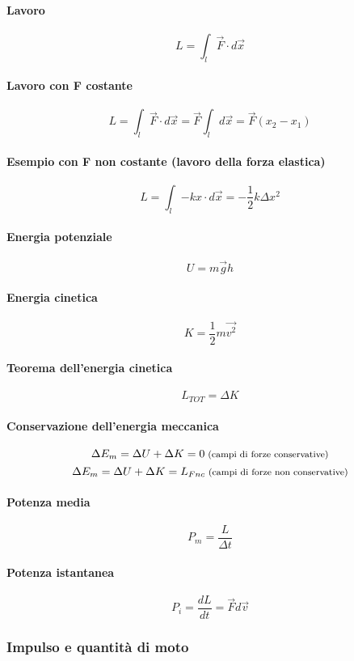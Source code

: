 \documentclass[12pt]{article}
\begin{document}
            \paragraph*{Lavoro}
            \[L = \int_{l}{\vec{F} \cdot d \vec{x}}\]
            \paragraph*{Lavoro con F costante}
            \[L = \int_{l}{\vec{F} \cdot d \vec{x}} = \vec{F}\int_{l}{ d \vec{x}} = \vec{F}(x_2 - x_1)\]
            \paragraph*{Esempio con F non costante (lavoro della forza elastica)}
            \[L = \int_{l}{-k x \cdot d \vec{x}} = -\frac{1}{2}k\Delta x^2\]
            \paragraph*{Energia potenziale}
            \[U = m\vec{g}h\]
            \paragraph*{Energia cinetica}
            \[K = \frac{1}{2}m\vec{v^2}\]
            \paragraph*{Teorema dell'energia cinetica}
            \[L_{TOT} = \Delta K\]
            \paragraph*{Conservazione dell'energia meccanica}
            \[\Delta E_m = \Delta U + \Delta K = 0 \text{\footnotesize{ (campi di forze conservative)}} \]
            \[\Delta E_m = \Delta U + \Delta K = L_{Fnc} \text{\footnotesize{ (campi di forze non conservative)}} \]
            \paragraph*{Potenza media}
            \[P_m = \frac{L}{\Delta t}\]
            \paragraph*{Potenza istantanea}
            \[P_i = \frac{dL}{dt} = \vec{F}d\vec{v}\]
        \subsubsection{Impulso e quantità di moto}
\end{document}
